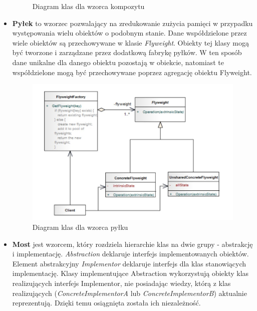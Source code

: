 \documentclass[a4paper,12pt,oneside]{book}
\begin{document}
\begin{itemize}
\begin{figure}[h]
                        \caption{Diagram klas dla wzorca kompozytu}
                        \label{fig:twojastara23}
                    \end{figure}
                    \item \textbf{Pyłek} to wzorzec pozwalający na zredukowanie zużycia pamięci w przypadku występowania wielu obiektów o podobnym stanie. Dane współdzielone przez wiele obiektów są przechowywane w klasie \textit{Flyweight}. Obiekty tej klasy mogą być tworzone i zarządzane przez dodatkową fabrykę pyłków. W ten sposób dane unikalne dla danego obiektu pozostają w obiekcie, natomiast te współdzielone mogą być przechowywane poprzez agregację obiektu Flyweight.  
                    \begin{figure}[h]
                        \centering
                        \includegraphics[width=\textwidth/2]{images/flyweight.jpg}
                        \caption{Diagram klas dla wzorca pyłku}
                        \label{fig:twojastara24}
                    \end{figure}
                    \item \textbf{Most} jest wzorcem, który rozdziela hierarchie klas na dwie grupy - abstrakcję i implementację. \textit{Abstraction} deklaruje interfejs implementowanych obiektów. Element abstrakcyjny \textit{Implementor} deklaruje interfejs dla klas stanowiących implementację. Klasy implementujące Abstraction wykorzystują obiekty klas realizujących interfejs Implementor, nie posiadając wiedzy, którą z klas realizujących (\textit{ConcreteImplementorA} lub \textit{ConcreteImplementorB}) aktualnie reprezentują. Dzięki temu osiągnięta została ich niezależność.
                    \begin{figure}[h]

\end{figure}
\end{itemize}
\end{document}
